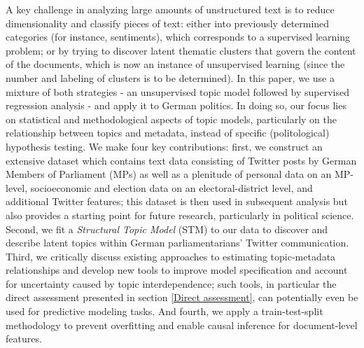 A key challenge in analyzing large amounts of unstructured text is to reduce dimensionality and classify pieces of text: either into previously determined categories (for instance, sentiments), which corresponds to a supervised learning problem; or by trying to discover latent thematic clusters that govern the content of the documents, which is now an instance of unsupervised learning (since the number and labeling of clusters is to be determined). In this paper, we use a mixture of both strategies - an unsupervised topic model followed by supervised regression analysis - and apply it to German politics. In doing so, our focus lies on statistical and methodological aspects of topic models, particularly on the relationship between topics and metadata, instead of specific (politological) hypothesis testing. We make four key contributions: first, we construct an extensive dataset which contains text data consisting of Twitter posts by German Members of Parliament (MPs) as well as a plenitude of personal data on an MP-level, socioeconomic and election data on an electoral-district level, and additional Twitter features; this dataset is then used in subsequent analysis but also provides a starting point for future research, particularly in political science. Second, we fit a \textit{Structural Topic Model} (STM) to our data to discover and describe latent topics within German parliamentarians' Twitter communication. Third, we critically discuss existing approaches to estimating topic-metadata relationships and develop new tools to improve model specification and account for uncertainty caused by topic interdependence; such tools, in particular the direct assessment presented in section \ref{Direct assessment}, can potentially even be used for predictive modeling tasks. And fourth, we apply a train-test-split methodology to prevent overfitting and enable causal inference for document-level features.

